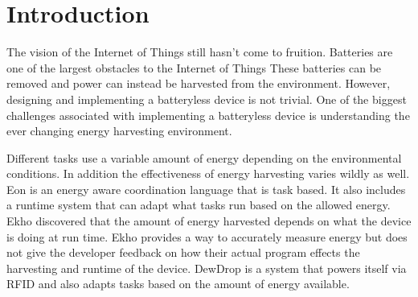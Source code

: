 \section{Introduction} %
\label{sec:introduction}

The vision of the Internet of Things still hasn't come to fruition.
Batteries are one of the largest obstacles to the Internet of Things \cite{intermittentAndAwesome}
These batteries can be removed and power can instead be harvested from the environment.
However, designing and implementing a batteryless device is not trivial.
One of the biggest challenges associated with implementing a batteryless device is understanding the ever changing energy harvesting environment.

Different tasks use a variable amount of energy depending on the environmental conditions.
In addition the effectiveness of energy harvesting varies wildly as well.
Eon \cite{eon} is an energy aware coordination language that is task based.
It also includes a runtime system that can adapt what tasks run based on the allowed energy.
Ekho \cite{ekho} discovered that the amount of energy harvested depends on what the device is doing at run time.
Ekho provides a way to accurately measure energy but does not give the developer feedback on how their actual program effects the harvesting and runtime of the device.
DewDrop \cite{dewdrop} is a system that powers itself via RFID and also adapts tasks based on the amount of energy available.
